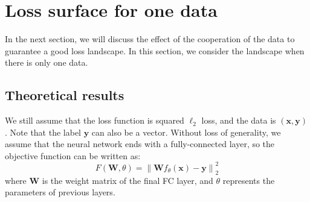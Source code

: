 \documentclass{article}
\theoremstyle{plain}
\theoremstyle{definition}
\newcommand{\norm}[1]{\left\lVert#1\right\rVert}
\begin{document}

\section{Loss surface for one data}

In the next section, we will discuss the effect of the cooperation of the data to guarantee a good loss landscape. In this section, we consider the landscape when there is only one data.

\subsection{Theoretical results}

We still assume that the loss function is squared $\ell_2$ loss, and the data is $(\mathbf{x},\mathbf{y})$. Note that the label $\mathbf{y}$ can also be a vector. Without loss of generality, we assume that the neural network ends with a fully-connected layer, so the objective function can be written as:
$$
F(\mathbf{W},\theta)=\norm{\mathbf{W}f_{\theta}(\mathbf{x})-\mathbf{y}}_2^2
$$
where $\mathbf{W}$ is the weight matrix of the final FC layer, and $\theta$ represents the parameters of previous layers.
\end{document}
